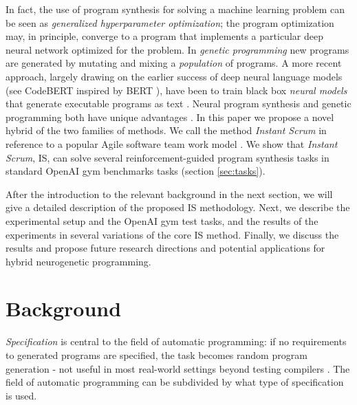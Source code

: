 In fact, the use of program synthesis for solving a machine learning problem can be seen as {\sl generalized hyperparameter optimization}; the program optimization may, in principle, converge to a program that implements a particular deep neural network optimized for the problem. 
 In \emph{genetic programming} \cite{genprog,genprogast} new programs are generated by mutating and mixing a \emph{population} of programs. 
 A more recent approach, largely drawing on the earlier success of deep neural language models (see CodeBERT \cite{codebert} inspired by BERT \cite{bert}), have been to train black box \emph{neural models} that generate executable programs as text \cite{brain-coder,deepcoder,structural}. 
 Neural program synthesis and genetic programming both have unique advantages \cite{geneticvsneural}. 
 In this paper we propose a novel hybrid of the two families of methods. We call the method \emph{Instant Scrum} in reference to a popular Agile software team work model \cite{scrum}. We show that \emph{Instant Scrum}, IS, can solve several reinforcement-guided program synthesis tasks in standard OpenAI gym benchmarks tasks (section \ref{sec:tasks}). 

After the introduction to the relevant background in the next section, we will give a detailed description of the proposed IS methodology. Next, we describe the experimental setup and the OpenAI gym test tasks, and the results of the experiments in several variations of the core IS method. Finally, we discuss the results and propose future research directions and potential applications for hybrid neurogenetic programming. 


\section{Background}


\emph{Specification} is central to the field of automatic programming: if no requirements to generated programs are specified, the task becomes random program generation - not useful in most real-world settings beyond testing compilers \cite{random1,random2}.
The field of automatic programming can be subdivided by what type of specification is used.

